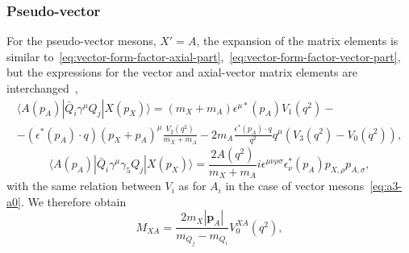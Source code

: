 \documentclass[a4paper,12pt,dvipsnames,usernames]{article}
\begin{document}
\subsubsection{Pseudo-vector}
\label{app:pseudovector}
For the pseudo-vector mesons, $X' = A$, the expansion of the matrix elements is similar to~\eqref{eq:vector-form-factor-axial-part},~\eqref{eq:vector-form-factor-vector-part}, but the expressions for the vector and axial-vector matrix elements are interchanged~\cite{Bashiry:2009wq,Hatanaka:2008gu},
\begin{multline}
    \langle A(p_{A})| \bar{Q}_{i}\gamma^{\mu}Q_{j} |X(p_{X})\rangle = (m_{X}+m_{A})\epsilon^{\mu *}(p_{A})V_{1}(q^{2}) - \\ -(\epsilon^{*}(p_{A})\cdot q)(p_{X} + p_{A})^{\mu}\frac{V_{2}(q^{2})}{m_{X}+m_{A}}-2m_{A}\frac{\epsilon^{*}(p_{A})\cdot q}{q^{2}}q^{\mu}(V_{3}(q^{2})-V_{0}(q^{2})),
    \label{eq:pseudovector-form-factor-axial-part}
\end{multline}
\begin{equation}
     \langle A(p_{A})| \bar{Q}_{i}\gamma^{\mu}\gamma_{5}Q_{j} |X(p_{X})\rangle= \frac{2A(q^{2})}{m_{X}+m_{A}}i\epsilon^{\mu\nu\rho\sigma}\epsilon^{*}_{\nu}(p_{A})p_{X, \rho}p_{A, \sigma},
     \label{eq:pseudovector-form-factor-vector-part}
\end{equation}
with the same relation between $V_i$ as for $A_i$ in the case of vector mesons~\eqref{eq:a3-a0}. We therefore obtain
\begin{equation}
    M_{XA} = \frac{2m_{X}|\bm{p}_{A}|}{m_{Q_{j}}-m_{Q_{i}}}V^{XA}_{0}(q^{2}),
\end{equation}
\end{document}
